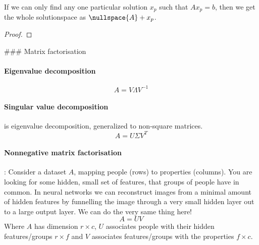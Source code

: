 \begin{theorem}
  If we can only find any one particular solution $x_p$ such that $A x_p = b$, then we get the whole solutionspace as $\nullspace{A} + x_p$.
\end{theorem}

\begin{proof}
\end{proof}





### Matrix factorisation

\paragraph{Eigenvalue decomposition}
$$ A = V \Lambda V^{-1} $$

\paragraph{Singular value decomposition} is eigenvalue decomposition, generalized to non-square matrices.
$$ A = U \Sigma V^T $$

\paragraph{Nonnegative matrix factorisation}: Consider a dataset $A$, mapping people (rows) to properties (columns). You are looking for some hidden, small set of features, that groups of people have in common. 
In neural networks we can reconstruct images from a minimal amount of hidden features by funnelling the image through a very small hidden layer out to a large output layer. We can do the very same thing here!
$$ A = U V $$
Where $A$ has dimension $r \times c$, $U$ associates people with their hidden features/groups $r \times f$ and $V$ associates features/groups with the properties $f \times c$.
